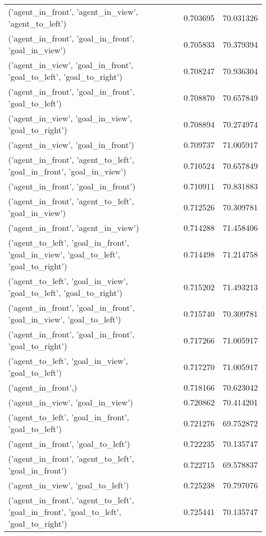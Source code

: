 \begin{tabular}{lrr}
('agent\_in\_front', 'agent\_in\_view', 'agent\_to\_left') & 0.703695 & 70.031326 \\
('agent\_in\_front', 'goal\_in\_front', 'goal\_in\_view') & 0.705833 & 70.379394 \\
('agent\_in\_view', 'goal\_in\_front', 'goal\_to\_left', 'goal\_to\_right') & 0.708247 & 70.936304 \\
('agent\_in\_front', 'goal\_in\_front', 'goal\_to\_left') & 0.708870 & 70.657849 \\
('agent\_in\_view', 'goal\_in\_view', 'goal\_to\_right') & 0.708894 & 70.274974 \\
('agent\_in\_view', 'goal\_in\_front') & 0.709737 & 71.005917 \\
('agent\_in\_front', 'agent\_to\_left', 'goal\_in\_front', 'goal\_in\_view') & 0.710524 & 70.657849 \\
('agent\_in\_front', 'goal\_in\_front') & 0.710911 & 70.831883 \\
('agent\_in\_front', 'agent\_to\_left', 'goal\_in\_view') & 0.712526 & 70.309781 \\
('agent\_in\_front', 'agent\_in\_view') & 0.714288 & 71.458406 \\
('agent\_to\_left', 'goal\_in\_front', 'goal\_in\_view', 'goal\_to\_left', 'goal\_to\_right') & 0.714498 & 71.214758 \\
('agent\_to\_left', 'goal\_in\_view', 'goal\_to\_left', 'goal\_to\_right') & 0.715202 & 71.493213 \\
('agent\_in\_front', 'goal\_in\_front', 'goal\_in\_view', 'goal\_to\_left') & 0.715740 & 70.309781 \\
('agent\_in\_front', 'goal\_in\_front', 'goal\_to\_right') & 0.717266 & 71.005917 \\
('agent\_to\_left', 'goal\_in\_view', 'goal\_to\_left') & 0.717270 & 71.005917 \\
('agent\_in\_front',) & 0.718166 & 70.623042 \\
('agent\_in\_view', 'goal\_in\_view') & 0.720862 & 70.414201 \\
('agent\_to\_left', 'goal\_in\_front', 'goal\_to\_left') & 0.721276 & 69.752872 \\
('agent\_in\_front', 'goal\_to\_left') & 0.722235 & 70.135747 \\
('agent\_in\_front', 'agent\_to\_left', 'goal\_in\_front') & 0.722715 & 69.578837 \\
('agent\_in\_view', 'goal\_to\_left') & 0.725238 & 70.797076 \\
('agent\_in\_front', 'agent\_to\_left', 'goal\_in\_front', 'goal\_to\_left', 'goal\_to\_right') & 0.725441 & 70.135747 \\

\end{tabular}
